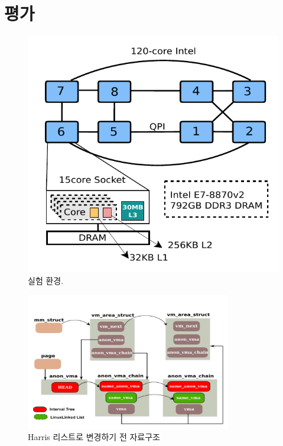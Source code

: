 \newpage

\section{평가}
\label{sec:evaluation}
\begin{figure}[h!]
  \begin{center}
    \includegraphics[scale=0.8]{fig/xeon}
  \end{center}
  \caption{실험 환경.}
  \label{fig:xeon}
\end{figure}
 
 \begin{figure}[h]
    \centering
    \includegraphics[width=0.8\textwidth]{fig/lockfree}
    \caption{Harris 리스트로 변경하기 전 자료구조}
  \label{fig:lockfree}
\end{figure}
 
